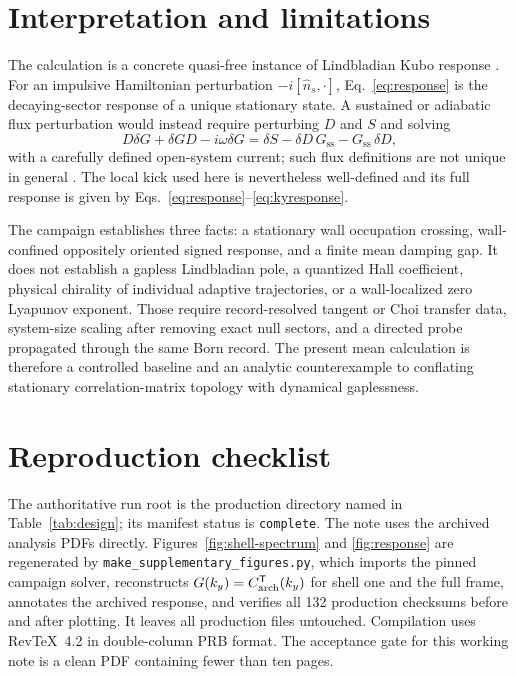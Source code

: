 \documentclass[aps,prb,twocolumn,nofootinbib,superscriptaddress,floatfix]{revtex4-2}
\newcommand{\Gss}{G_{\mathrm{ss}}}
\begin{document}
\section{Interpretation and limitations}

The calculation is a concrete quasi-free instance of Lindbladian Kubo response
\cite{Albert2016,Venuti2016}. For an impulsive Hamiltonian perturbation
$-i[\hat n_s,\mathord\cdot]$, Eq.~\eqref{eq:response} is the decaying-sector response of a
unique stationary state. A sustained or adiabatic flux perturbation would
instead require perturbing $D$ and $S$ and solving
\begin{equation}
 D\delta G+\delta G D-i\omega\delta G
 =\delta S-\delta D\,\Gss-\Gss\,\delta D,
\end{equation}
with a carefully defined open-system current; such flux definitions are not
unique in general \cite{Avron2012}. The local kick used here is nevertheless
well-defined and its full response is given by
Eqs.~\eqref{eq:response}--\eqref{eq:kyresponse}.

The campaign establishes three facts: a stationary wall occupation crossing,
wall-confined oppositely oriented signed response, and a finite mean damping
gap. It does not establish a gapless Lindbladian pole, a quantized Hall
coefficient, physical chirality of individual adaptive trajectories, or a
wall-localized zero Lyapunov exponent. Those require record-resolved tangent
or Choi transfer data, system-size scaling after removing exact null sectors,
and a directed probe propagated through the same Born record. The present
mean calculation is therefore a controlled baseline and an analytic
counterexample to conflating stationary correlation-matrix topology with dynamical
gaplessness.

\section{Reproduction checklist}

The authoritative run root is the production directory named in
Table~\ref{tab:design}; its manifest status is \texttt{complete}. The note
uses the archived analysis PDFs directly. Figures~\ref{fig:shell-spectrum} and
\ref{fig:response} are regenerated by
\texttt{make\_supplementary\_figures.py}, which imports the pinned campaign
solver, reconstructs $G(k_y)=C_{\rm arch}^{\mathsf T}(k_y)$ for shell one and
the full frame, annotates the
archived response, and verifies all 132 production checksums before and after
plotting. It leaves all production files untouched. Compilation uses
RevTeX~4.2 in double-column PRB format. The acceptance gate for this working
note is a clean PDF containing fewer than ten pages.
\end{document}
